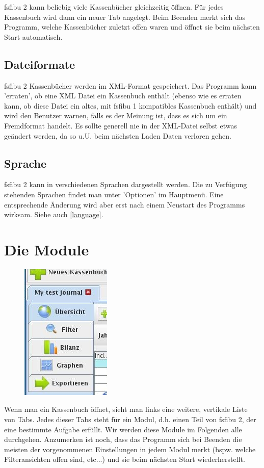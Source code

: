 \documentclass[a4paper,10pt,halfparskip,oneside,smallheadings]{scrbook}
\begin{document}
fsfibu 2 kann beliebig viele Kassenbücher gleichzeitig öffnen. Für jedes Kassenbuch wird dann ein neuer Tab angelegt. Beim Beenden merkt sich das Programm, welche Kassenbücher zuletzt offen waren und öffnet sie beim nächsten Start automatisch.

\subsection{Dateiformate}
fsfibu 2 Kassenbücher werden im XML-Format gespeichert. Das Programm kann 'erraten', ob eine XML Datei ein Kassenbuch enthält (ebenso wie es erraten kann, ob diese Datei ein altes, mit fsfibu 1 kompatibles Kassenbuch enthält) und wird den Benutzer warnen, falls es der Meinung ist, dass es sich um ein Fremdformat handelt. Es sollte generell nie in der XML-Datei selbst etwas geändert werden, da so u.U. beim nächsten Laden Daten verloren gehen.

\subsection{Sprache}
fsfibu 2 kann in verschiedenen Sprachen dargestellt werden. Die zu Verfügung stehenden Sprachen findet man unter 'Optionen' im Hauptmenü. Eine entsprechende Änderung wird aber erst nach einem Neustart des Programms wirksam. Siehe auch \ref{language}.

\section{Die Module}
\begin{figure}[h!]
 \includegraphics{modules}
\end{figure}

Wenn man ein Kassenbuch öffnet, sieht man links eine weitere, vertikale Liste von Tabs. Jedes dieser Tabs steht für ein Modul, d.h. einen Teil von fsfibu 2, der eine bestimmte Aufgabe erfüllt. Wir werden diese Module im Folgenden alle durchgehen. Anzumerken ist noch, dass das Programm sich bei Beenden die meisten der vorgenommenen Einstellungen in jedem Modul merkt (bspw. welche Filteransichten offen sind, etc...) und sie beim nächsten Start wiederherstellt.
\end{document}
